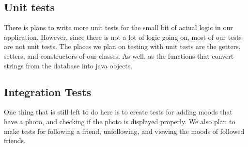\subsection{Unit tests}

There is plans to write more unit tests for the small bit of actual logic in
our application. However, since there is not a lot of logic going on, most of
our tests are not unit tests. The places we plan on testing with unit tests are the getters, setters, and
constructors of our classes. As well, as the functions that convert strings
from the database into java objects.

\subsection{Integration Tests}

One thing that is still left to do here is to create tests for adding moods
that have a photo, and checking if the photo is displayed properly. We also
plan to make tests for following a friend, unfollowing, and viewing the moods
of followed friends.




